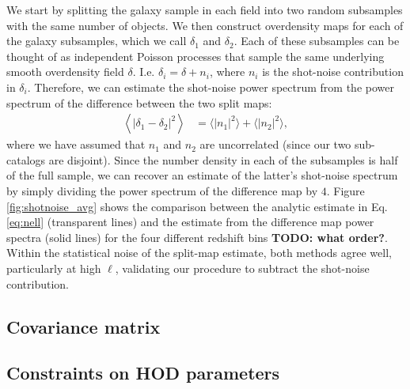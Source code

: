 \documentclass[a4paper,11pt]{article}
\newcommand{\todo}[1]{{\bf TODO: #1}}
\begin{document}
      We start by splitting the galaxy sample in each field into two random subsamples with the same number of objects.  We then construct overdensity maps for each of the galaxy subsamples, which we call $\delta_1$ and $\delta_2$.  Each of these subsamples can be thought of as independent Poisson processes that sample the same underlying smooth overdensity field $\delta$. I.e. $\delta_i = \delta + n_i$, where $n_i$ is the shot-noise contribution in $\delta_i$. Therefore, we can estimate the shot-noise power spectrum from the power spectrum of the difference between the two split maps:
      \begin{align}
      \left\langle |\delta_1 - \delta_2|^2 \right\rangle & = \langle|n_1|^2\rangle + \langle|n_2|^2\rangle,
      \end{align}
      where we have assumed that $n_1$ and $n_2$ are uncorrelated (since our two sub-catalogs are disjoint). Since the number density in each of the subsamples is half of the full sample, we can recover an estimate of the latter's shot-noise spectrum by simply dividing the power spectrum of the difference map by $4$. Figure \ref{fig:shotnoise_avg} shows the comparison between the analytic estimate in Eq. \ref{eq:nell} (transparent lines) and the estimate from the difference map power spectra (solid lines) for the four different redshift bins \todo{what order?}. Within the statistical noise of the split-map estimate, both methods agree well, particularly at high $\ell$, validating our procedure to subtract the shot-noise contribution.
      
    
  \subsection{Covariance matrix}
  \subsection{Constraints on HOD parameters}
\end{document}
